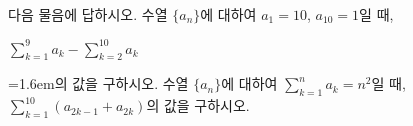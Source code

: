 다음 물음에 답하시오.
 수열 $\{a_n\}$에 대하여 $a_1=10$, $a_{10}=1$일 때, \par\smallskip\centerline{$\displaystyle\sum_{k=1}^{9}a_k-\sum_{k=2}^{10}a_k$}\par\smallskip\noindent\hangindent=1.6em\relax 의 값을 구하시오.
 수열 $\{a_n\}$에 대하여 $\displaystyle\sum_{k=1}^{n}a_k=n^2$일 때, $\displaystyle\sum_{k=1}^{10}(a_{2k-1}+a_{2k})$의 값을 구하시오.
